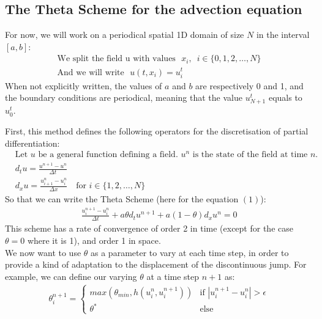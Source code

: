 \documentclass[12pt]{article}
\begin{document}
\subsection{The Theta Scheme for the advection equation}
For now, we will work on a periodical spatial 1D domain of size $N$ in the interval $[a,b]$:
\begin{align*}
    \text{We split the field u with values} \hspace{8pt} x_i \text{,} \hspace{8pt} i \in \{0, 1, 2, \ldots, N\} \\
    \text{And we will write} \hspace{8pt} u(t,x_i) = u_i^t
\end{align*}
When not explicitly written, the values of $a$ and $b$ are respectively 0 and 1, and the boundary conditions are periodical,
meaning that the value $u_{N+1}^t$ equals to $u_0^t$.

First, this method defines the following operators for the discretisation of partial differentiation:
\begin{align*}
    & \text{Let } u \text{ be a general function defining a field. } u^n \text{ is the state of the field at time } n. \\
    &  d_t u = \frac{u^{n+1} - u^n}{\Delta t} \\
    &  d_x u = \frac{u_{i+1}^n - u_i^n}{\Delta x} \quad \text{for } i \in \{1, 2, \ldots, N\}
\end{align*}
So that we can write the Theta Scheme (here for the equation $(1)$):
\begin{align*}
    \frac{u_i^{n+1} - u_i^n}{\Delta t} + a\theta d_t u^{n+1} + a(1-\theta) d_x u^n = 0 \tag{2}
\end{align*}
This scheme has a rate of convergence of order 2 in time (except for the case $\theta=0$ where it is 1), and order 1 in space.\\



We now want to use $\theta$ as a parameter to vary at each time step, in order to provide a kind of adaptation to the displacement of the discontinuous jump.
For example, we can define our varying $\theta$ at a time step $n+1$ as:
\begin{align*}
    \theta_i^{n+1} = \begin{cases}
        max(\theta_{min}, h(u_i^n, u_i^{n+1})) & \text{if } |u_i^{n+1} - u_i^n| > \epsilon \\
        \theta^* & \text{else} 
    \end{cases}
\end{align*}


\end{document}
